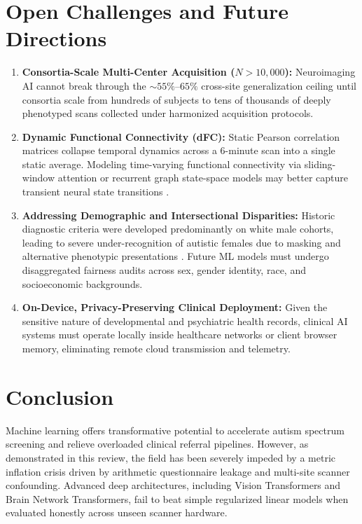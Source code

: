 \documentclass[journal]{IEEEtran}
\begin{document}
\section{Open Challenges and Future Directions}
\begin{enumerate}
    \item \textbf{Consortia-Scale Multi-Center Acquisition ($N > 10,000$):} Neuroimaging AI cannot break through the $\sim 55\%$--$65\%$ cross-site generalization ceiling until consortia scale from hundreds of subjects to tens of thousands of deeply phenotyped scans collected under harmonized acquisition protocols.
    \item \textbf{Dynamic Functional Connectivity (dFC):} Static Pearson correlation matrices collapse temporal dynamics across a 6-minute scan into a single static average. Modeling time-varying functional connectivity via sliding-window attention or recurrent graph state-space models may better capture transient neural state transitions \cite{calhoun2014chronnectome}.
    \item \textbf{Addressing Demographic and Intersectional Disparities:} Historic diagnostic criteria were developed predominantly on white male cohorts, leading to severe under-recognition of autistic females due to masking and alternative phenotypic presentations \cite{happe2020annual}. Future ML models must undergo disaggregated fairness audits across sex, gender identity, race, and socioeconomic backgrounds.
    \item \textbf{On-Device, Privacy-Preserving Clinical Deployment:} Given the sensitive nature of developmental and psychiatric health records, clinical AI systems must operate locally inside healthcare networks or client browser memory, eliminating remote cloud transmission and telemetry.
\end{enumerate}

\section{Conclusion}
Machine learning offers transformative potential to accelerate autism spectrum screening and relieve overloaded clinical referral pipelines. However, as demonstrated in this review, the field has been severely impeded by a metric inflation crisis driven by arithmetic questionnaire leakage and multi-site scanner confounding. Advanced deep architectures, including Vision Transformers and Brain Network Transformers, fail to beat simple regularized linear models when evaluated honestly across unseen scanner hardware.
\end{document}
